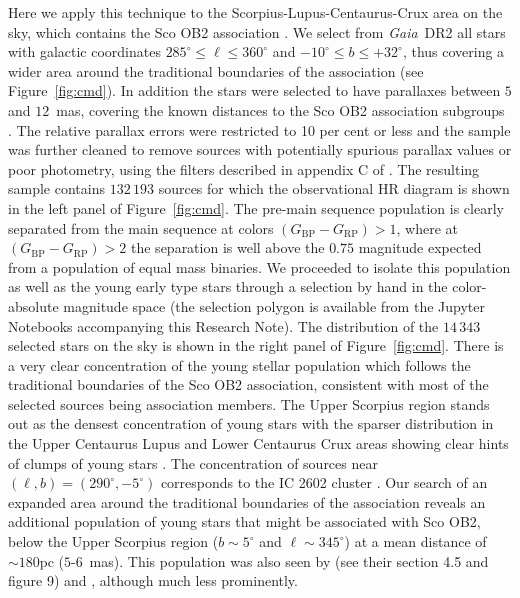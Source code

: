 \documentclass[RNAAS]{aastex62}
\newcommand\gaia{\textit{Gaia}}
\newcommand\gdr[1]{\gaia~DR#1}
\begin{document}
Here we apply this technique to the Scorpius-Lupus-Centaurus-Crux area on the sky, which contains the Sco OB2 association \citep{Blaauw46}. We select from \gdr{2} all stars with galactic coordinates $285^\circ\leq\ell\leq360^\circ$ and $-10^\circ\leq b\leq+32^\circ$, thus covering a wider area around the traditional boundaries of the association (see Figure~\ref{fig:cmd}). In addition the stars were selected to have parallaxes between $5$ and $12$~mas, covering the known distances to the Sco OB2 association subgroups \citep{Wright18}. The relative parallax errors were restricted to 10 per cent or less and the sample was further cleaned to remove sources with potentially spurious parallax values or poor photometry, using the filters described in appendix C of \cite{Lindegren18}. The resulting sample contains $132\,193$ sources for which the observational HR diagram is shown in the left panel of Figure~\ref{fig:cmd}. The pre-main sequence population is clearly separated from the main sequence at colors $(G_\mathrm{BP}-G_\mathrm{RP})>1$, where at $(G_\mathrm{BP}-G_\mathrm{RP})>2$ the separation is well above the $0.75$ magnitude expected from a population of equal mass binaries. We proceeded to isolate this population as well as the young early type stars through a selection by hand in the color-absolute magnitude space (the selection polygon is available from the Jupyter Notebooks accompanying this Research Note). The distribution of the $14\,343$ selected stars on the sky is shown in the right panel of Figure~\ref{fig:cmd}. There is a very clear concentration of the young stellar population which follows the traditional boundaries of the Sco OB2 association, consistent with most of the selected sources being association members. The Upper Scorpius region stands out as the densest concentration of young stars with the sparser distribution in the Upper Centaurus Lupus and Lower Centaurus Crux areas showing clear hints of clumps of young stars \citep[indications of substructure were also found by][]{deZeeuw99}. The concentration of sources near $(\ell,b)=(290^\circ,-5^\circ)$ corresponds to the IC 2602 cluster \citep[$\varpi=6.74\pm0.25$~mas;][]{vanLeeuwen17}. Our search of an expanded area around the traditional boundaries of the association reveals an additional population of young stars that might be associated with Sco OB2, below the Upper Scorpius region ($b\sim5^\circ$ and $\ell\sim345^\circ$) at a mean distance of $\sim180\mathrm{pc}$ ($5$-$6$~mas). This population was also seen by \cite{deZeeuw99} (see their section 4.5 and figure 9) and \cite{Mamajek2016}, although much less prominently.
\end{document}
